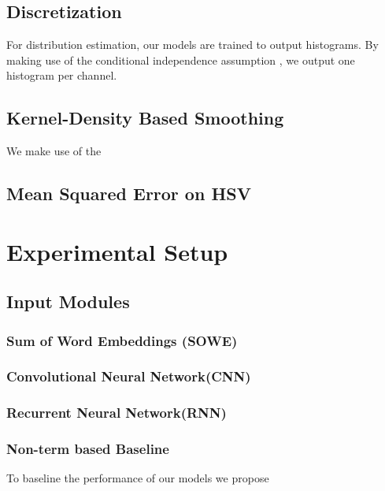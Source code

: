 \documentclass[11pt,a4paper]{article}
\newcommand{\textcite}{\citet}
\begin{document}
\subsection{Discretization}
For distribution estimation, our models are trained to output histograms.
By making use of the conditional independence assumption ,
we output one histogram per channel.


\subsection{Kernel-Density Based Smoothing}\label{sec:kernel-density-based-smoothing}


We make use of the \textcite{silverman1982algorithm}





\subsection{Mean Squared Error on HSV}




\section{Experimental Setup}

\subsection{Input Modules}

\subsubsection{Sum of Word Embeddings (SOWE)}

\subsubsection{Convolutional Neural Network(CNN)}
\subsubsection{Recurrent Neural Network(RNN)}



\subsubsection{Non-term based Baseline}
To baseline the performance of our models we propose 
\end{document}
